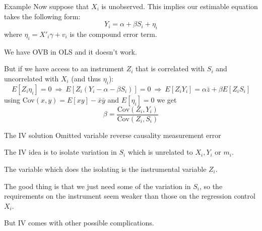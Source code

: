\documentclass{beamer}
\begin{document}
\begin{frame}{Example}
Now suppose that $X_i$ is unobserved. This implies our estimable equation takes the following form:
\[Y_i =\alpha+\beta S_i+\eta_i\]
where $\eta_i = X'_i\gamma
+ v_i$ is the compound error term.\medskip 

We have OVB in OLS and it doesn't work.\medskip

But if we have access to an instrument $Z_i$ that is correlated with $S_i$ and uncorrelated with $X_i$ (and thus $\eta_i$):
\[E[Z_i\eta_i]=0 \ \Rightarrow \ E[Z_i(Y_i-\alpha-\beta S_i)]=0 \ \Rightarrow \ E[Z_iY_i]=\alpha \bar{z} +\beta E[Z_i S_i] \]
using Cov$(x,y)=E[xy]-\bar{x}\bar{y}$ and $E[\eta_i]=0$ we get \[\beta=\frac{\text{Cov}(Z_i,Y_i)}{\text{Cov}(Z_i,S_i)}\]
\end{frame}



\begin{frame}{The IV solution}
	Omitted variable \qquad  \quad reverse causality \qquad
	\quad measurement error\medskip
	
	
	
The IV idea is to isolate variation in $S_i$ which is unrelated to $X_i, Y_i$ or $m_i$.\medskip

The variable which does the isolating is the instrumental variable $Z_i$.\medskip

The good thing is that we just need some of the variation in $S_i$, so the requirements on the instrument seem weaker than those on the regression control $X_i$. \medskip

But IV comes with other possible complications.
\end{frame}
\end{document}
